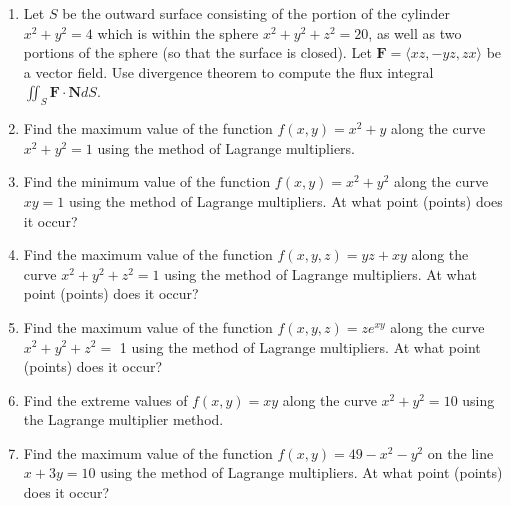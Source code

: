 \documentclass[10pt]{article}
\begin{document}
\begin{enumerate}
  \item Let $S$ be the outward surface consisting of the portion of the cylinder $x^{2}+y^{2}=4$ which is within the sphere $x^{2}+y^{2}+z^{2}=20$, as well as two portions of the sphere (so that the surface is closed). Let $\mathbf{F}=\langle x z,-y z, z x\rangle$ be a vector field. Use divergence theorem to compute the flux integral $\iint_{S} \mathbf{F} \cdot \mathbf{N} d S$.
  
	\vspace*{0.4\textheight}
	
	\item Find the maximum value of the function $f(x, y)=x^{2}+y$ along the curve $x^{2}+y^{2}=1$ using the method of Lagrange multipliers.
	
	\vspace*{0.42\textheight}
	
  \item Find the minimum value of the function $f(x, y)=x^{2}+y^{2}$ along the curve $x y=1$ using the method of Lagrange multipliers. At what point (points) does it occur?
	
	\vspace*{0.42\textheight}
  
	\item Find the maximum value of the function $f(x, y, z)=y z+x y$ along the curve $x^{2}+ y^{2}+z^{2}=1$ using the method of Lagrange multipliers. At what point (points) does it occur?
	
	\vspace*{0.42\textheight}
	
  \item Find the maximum value of the function $f(x, y, z)=z e^{x y}$ along the curve $x^{2}+y^{2}+z^{2}=$ 1 using the method of Lagrange multipliers. At what point (points) does it occur?
  
	\vspace*{0.42\textheight}
	
	\item Find the extreme values of $f(x, y)=x y$ along the curve $x^{2}+y^{2}=10$ using the Lagrange multiplier method.
   
	\vspace*{0.45\textheight}
	
	\item Find the maximum value of the function $f(x, y)=49-x^{2}-y^{2}$ on the line $x+3 y=10$ using the method of Lagrange multipliers. At what point (points) does it occur?
  
	 \vspace*{0.42\textheight}
	

\end{enumerate}
\end{document}
